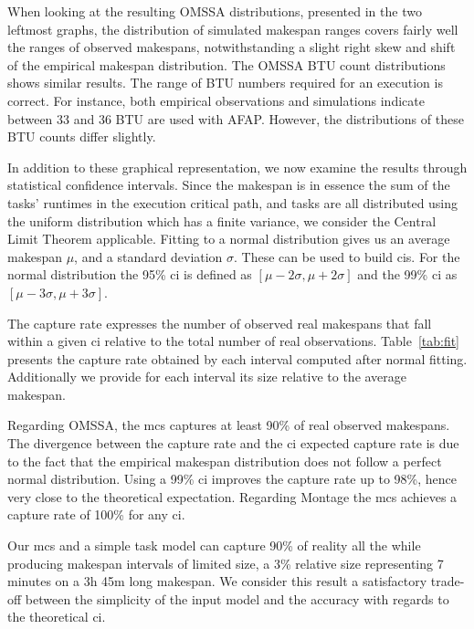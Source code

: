 \documentclass[]{llncs}
\begin{document}
When looking at the resulting OMSSA distributions, presented in the two leftmost
graphs,  the distribution  of simulated  makespan ranges  covers fairly  well the
ranges of  observed makespans, notwithstanding a  slight right skew and  shift of
the empirical  makespan distribution.  The  OMSSA BTU count  distributions shows
similar results.  The range of BTU  numbers required for an execution is correct.
For instance,  both empirical  observations  and simulations  indicate
between  33 and  36 BTU  are used with AFAP. However, the  distributions of  these BTU  counts
differ slightly.

In addition to these graphical representation, we now examine the results through
statistical confidence intervals.   Since the makespan is in essence  the sum of 
the tasks' runtimes  in the  execution critical path,  and tasks  are all
distributed  using the  uniform distribution  which  has a  finite variance,  we
consider the Central Limit Theorem applicable.  Fitting to a normal distribution 
gives us an average makespan $\mu{}$, and a standard deviation $\sigma{}$. These
can be used to  build \acp{ci}. For the normal distribution  the 95\% \ac{ci} is
defined  as   $[\mu{}-2\sigma{},\mu{}+2\sigma{}]$  and   the  99\%   \ac{ci}  as
$[\mu{}-3\sigma{},\mu{}+3\sigma{}]$.

The capture rate expresses the number of observed real makespans that fall
within a given \ac{ci} relative to the total number of real observations.
Table~\ref{tab:fit} presents the capture rate obtained by each interval computed
after normal fitting.  Additionally we provide for each interval its size
relative to the average makespan.

Regarding OMSSA, the  \ac{mcs} captures at least 90\% of real observed  makespans. The divergence
between the  capture rate and  the \ac{ci} expected capture  rate is due  to the
fact that the  empirical makespan distribution does not follow a perfect normal
distribution. Using  a 99\% \ac{ci}  improves the capture  rate up to  98\%,
hence very close  to the theoretical expectation. Regarding Montage  the
\ac{mcs} achieves a capture rate of 100\% for any \ac{ci}.


Our \ac{mcs} and a simple task model can capture 90\% of reality all the while
producing makespan intervals of limited size, a 3\% relative size representing 7
minutes on a 3h 45m long makespan. We consider this result a satisfactory
trade-off between the simplicity of the input model and the accuracy with
regards to the theoretical \ac{ci}.
\end{document}
